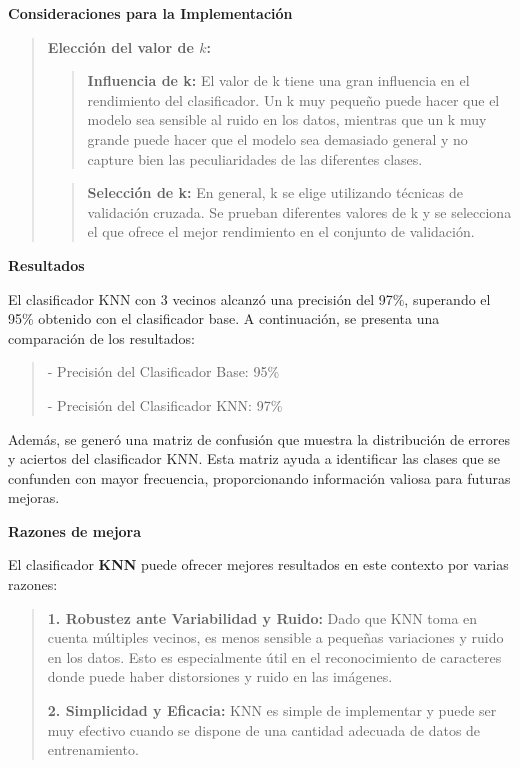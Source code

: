 \documentclass[a4paper, 12pt]{article}
\begin{document}
\textbf{Consideraciones para la Implementación}

\begin{quote}
	\textbf{Elección del valor de $k$:}
	\begin{quote}
		\textbf{Influencia de k:} El valor de k tiene una gran influencia en el rendimiento del clasificador. Un k muy pequeño puede hacer que el modelo sea sensible al ruido en los datos, mientras que un k muy grande puede hacer que el modelo sea demasiado general y no capture bien las peculiaridades de las diferentes clases.
	\end{quote}
	
	\begin{quote}
		\textbf{Selección de k:} En general, k se elige utilizando técnicas de validación cruzada. Se prueban diferentes valores de k y se selecciona el que ofrece el mejor rendimiento en el conjunto de validación.
	\end{quote}
	
\end{quote}

\textbf{Resultados}

El clasificador KNN con 3 vecinos alcanzó una precisión del 97\%, superando el 95\% obtenido con el clasificador base. A continuación, se presenta una comparación de los resultados:

\begin{quote}
	- Precisión del Clasificador Base: 95\%
	
	- Precisión del Clasificador KNN: 97\%
\end{quote}

Además, se generó una matriz de confusión que muestra la distribución de errores y aciertos del clasificador KNN. Esta matriz ayuda a identificar las clases que se confunden con mayor frecuencia, proporcionando información valiosa para futuras mejoras.

\textbf{Razones de mejora}

El clasificador \textbf{KNN} puede ofrecer mejores resultados en este contexto por varias razones:
\begin{quote}
	\textbf{1. Robustez ante Variabilidad y Ruido:} Dado que KNN toma en cuenta múltiples vecinos, es menos sensible a pequeñas variaciones y ruido en los datos. Esto es especialmente útil en el reconocimiento de caracteres donde puede haber distorsiones y ruido en las imágenes.

	\textbf{2. Simplicidad y Eficacia:} KNN es simple de implementar y puede ser muy efectivo cuando se dispone de una cantidad adecuada de datos de entrenamiento. 
	
\end{quote}
\end{document}
